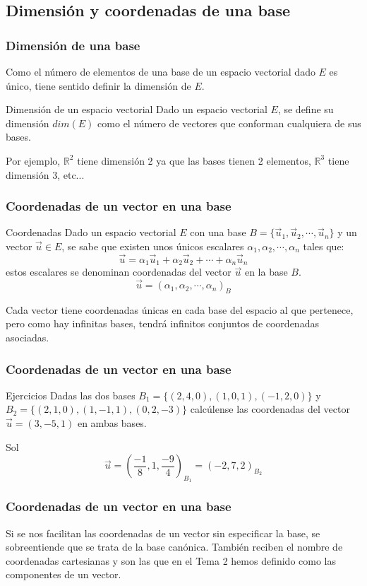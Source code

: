 \documentclass{beamer}
\begin{document}
  
  \subsection{Dimensi\'on y coordenadas de una base}
  \begin{frame}
  \frametitle{Dimensi\'on de una base}
Como el n\'umero de elementos de una base de un espacio vectorial dado $E$ es \'unico, tiene sentido definir la dimensi\'on de $E$.  
\begin{block}{Dimensi\'on de un espacio vectorial}
Dado un espacio vectorial $E$, se define su dimensi\'on $dim(E)$ como el n\'umero de vectores que conforman cualquiera de sus bases.
\end{block}
Por ejemplo, $\mathbb R^2$ tiene dimensi\'on 2 ya que las bases tienen 2 elementos, $\mathbb R^3$ tiene dimensi\'on 3, etc...
  \end{frame}
  
  
   \begin{frame}
  \frametitle{Coordenadas de un vector en una base}
\begin{block}{Coordenadas}
Dado un espacio vectorial $E$ con una base $B=\{\vec u_1,\vec u_2,\cdots, \vec u_n\}$ y un vector $\vec u\in E$, se sabe que existen unos \'unicos escalares $\alpha_1,\alpha_2,\cdots,\alpha_n$ tales que:
\[\vec u = \alpha_1\vec u_1+\alpha_2\vec u_2+\cdots+\alpha_n\vec u_n\]
estos escalares se denominan coordenadas del vector $\vec u$ en la base $B$.
\[\vec u = (\alpha_1,\alpha_2,\cdots,\alpha_n)_{B}\] 
\end{block}
Cada vector tiene coordenadas \'unicas en cada base del espacio al que pertenece, pero como hay infinitas bases, tendr\'a infinitos conjuntos de coordenadas asociadas.
\end{frame}
  
  
    \begin{frame}
  \frametitle{Coordenadas de un vector en una base}
\begin{block}{Ejercicios}
Dadas las dos bases $B_1=\{(2,4,0),(1,0,1),(-1,2,0)\}$ y $B_2 = \{(2,1,0),(1,-1,1),(0,2,-3)\}$ calc\'ulense las coordenadas del vector $\vec{u} = (3,-5,1)$ en ambas bases.
\end{block}
Sol\[\vec u = \left(\frac{-1}{8},1,\frac{-9}{4}\right)_{B_1} = (-2,7,2)_{B_2}\]
\end{frame}

   \begin{frame}
  \frametitle{Coordenadas de un vector en una base}
Si se nos facilitan las coordenadas de un vector sin especificar la base, se sobreentiende que se trata de la base can\'onica. Tambi\'en reciben el nombre de coordenadas cartesianas y son las que en el Tema 2 hemos definido como las componentes de un vector.
\end{frame}
\end{document}
